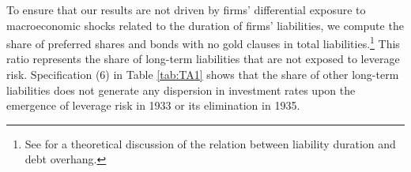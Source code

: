 To ensure that our results are not driven by firms' differential exposure to macroeconomic shocks related to the duration of firms' liabilities, we compute the share of preferred shares and bonds with no gold clauses in total liabilities.\footnote{See \cite{Diamond2014} for a theoretical discussion of the relation between liability duration and debt overhang.} This ratio represents the share of long-term liabilities that are not exposed to leverage risk. Specification (6) in Table \ref{tab:TA1} shows that the share of other long-term liabilities does not generate any dispersion in investment rates upon the emergence of leverage risk in 1933 or its elimination in 1935.